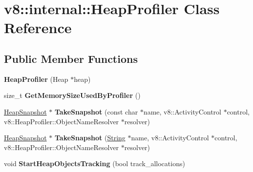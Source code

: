 \hypertarget{classv8_1_1internal_1_1_heap_profiler}{}\section{v8\+:\+:internal\+:\+:Heap\+Profiler Class Reference}
\label{classv8_1_1internal_1_1_heap_profiler}
\subsection*{Public Member Functions}
\begin{DoxyCompactItemize}
\item 
\hypertarget{classv8_1_1internal_1_1_heap_profiler_a9db62c5fefbbac5e205b512ae91ab7a5}{}{\bfseries Heap\+Profiler} (Heap $\ast$heap)\label{classv8_1_1internal_1_1_heap_profiler_a9db62c5fefbbac5e205b512ae91ab7a5}

\item 
\hypertarget{classv8_1_1internal_1_1_heap_profiler_a48c63ad30599ec88e912f5404b3f467f}{}size\+\_\+t {\bfseries Get\+Memory\+Size\+Used\+By\+Profiler} ()\label{classv8_1_1internal_1_1_heap_profiler_a48c63ad30599ec88e912f5404b3f467f}

\item 
\hypertarget{classv8_1_1internal_1_1_heap_profiler_a00d4a155987247234db3e291b7683456}{}\hyperlink{classv8_1_1internal_1_1_heap_snapshot}{Heap\+Snapshot} $\ast$ {\bfseries Take\+Snapshot} (const char $\ast$name, v8\+::\+Activity\+Control $\ast$control, v8\+::\+Heap\+Profiler\+::\+Object\+Name\+Resolver $\ast$resolver)\label{classv8_1_1internal_1_1_heap_profiler_a00d4a155987247234db3e291b7683456}

\item 
\hypertarget{classv8_1_1internal_1_1_heap_profiler_abb8446e20c67c72e8c3131765648155a}{}\hyperlink{classv8_1_1internal_1_1_heap_snapshot}{Heap\+Snapshot} $\ast$ {\bfseries Take\+Snapshot} (\hyperlink{classv8_1_1internal_1_1_string}{String} $\ast$name, v8\+::\+Activity\+Control $\ast$control, v8\+::\+Heap\+Profiler\+::\+Object\+Name\+Resolver $\ast$resolver)\label{classv8_1_1internal_1_1_heap_profiler_abb8446e20c67c72e8c3131765648155a}

\item 
\hypertarget{classv8_1_1internal_1_1_heap_profiler_a7efaf5b020faba52d5006f6122977fb2}{}void {\bfseries Start\+Heap\+Objects\+Tracking} (bool track\+\_\+allocations)\label{classv8_1_1internal_1_1_heap_profiler_a7efaf5b020faba52d5006f6122977fb2}


\end{DoxyCompactItemize}

